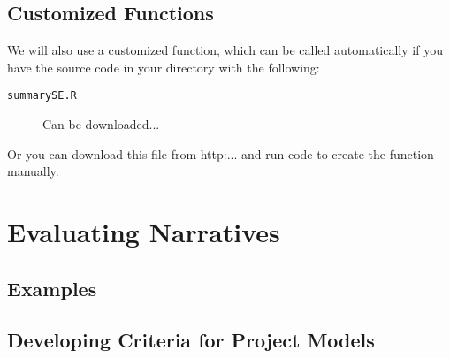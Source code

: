 \documentclass{article}\usepackage[]{graphicx}\usepackage[]{color}
\begin{document}
\subsection{Customized Functions}

We will also use a customized function, which can be called automatically if you have the source code in your directory with the following: 
\begin{description}
  \item[\texttt{summarySE.R}] Can be downloaded...
\end{description}


Or you can download this file from http:... and run code to create the function manually. 

\section{Evaluating Narratives}

\subsection{Examples}


\subsection{Developing Criteria for Project Models}

\subsection{}

\subsection{}
\end{document}
